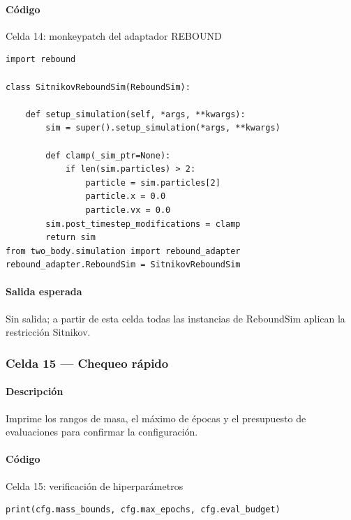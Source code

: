 \paragraph{Código}
\begin{listing}[H]
\caption{Celda 14: monkeypatch del adaptador REBOUND}
\begin{adjustbox}{max width=\textwidth}
\begin{minipage}{\textwidth}
\begin{verbatim}
import rebound

class SitnikovReboundSim(ReboundSim):

    def setup_simulation(self, *args, **kwargs):
        sim = super().setup_simulation(*args, **kwargs)

        def clamp(_sim_ptr=None):
            if len(sim.particles) > 2:
                particle = sim.particles[2]
                particle.x = 0.0
                particle.vx = 0.0
        sim.post_timestep_modifications = clamp
        return sim
from two_body.simulation import rebound_adapter
rebound_adapter.ReboundSim = SitnikovReboundSim
\end{verbatim}
\end{minipage}
\end{adjustbox}
\end{listing}
\paragraph{Salida esperada} Sin salida; a partir de esta celda todas las instancias de ReboundSim aplican la restricción Sitnikov.

\subsubsection*{Celda 15 — Chequeo rápido}
\paragraph{Descripción} Imprime los rangos de masa, el máximo de épocas y el presupuesto de evaluaciones para confirmar la configuración.
\paragraph{Código}
\begin{listing}[H]
\caption{Celda 15: verificación de hiperparámetros}
\begin{adjustbox}{max width=\textwidth}
\begin{minipage}{\textwidth}
\begin{verbatim}
print(cfg.mass_bounds, cfg.max_epochs, cfg.eval_budget)
\end{verbatim}
\end{minipage}
\end{adjustbox}
\end{listing}
